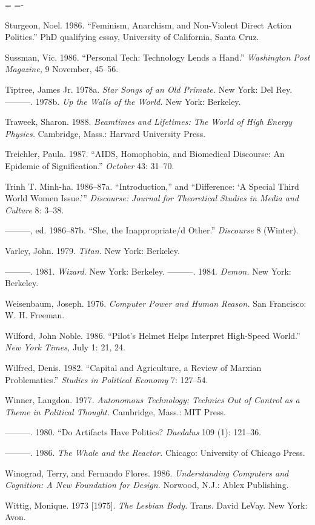 \documentclass[DIV=12,%
               BCOR=10mm,%
               headinclude=false,%
               footinclude=false,open=any,%
               fontsize=11pt,%
               twoside,%
               paper=210mm:11in]%
               {scrbook}
\newenvironment*{amusebiblio}{
  \leftskip=\parindent
  \parindent=-\parindent
  \smallskip
  \indent
}{\smallskip}
\newcommand*{\Slash}{\slash\hspace{0pt}}
\begin{document}
\begin{amusebiblio}
Sturgeon, Noel. 1986. “Feminism, Anarchism, and Non-Violent Direct Action Politics.” PhD qualifying essay, University of California, Santa Cruz.


Sussman, Vic. 1986. “Personal Tech: Technology Lends a Hand.” \emph{Washington Post Magazine,} 9 November, 45–56.


Tiptree, James Jr. 1978a. \emph{Star Songs of an Old Primate.} New York: Del Rey. ———. 1978b. \emph{Up the Walls of the World.} New York: Berkeley.


Traweek, Sharon. 1988. \emph{Beamtimes and Lifetimes: The World of High Energy Physics.} Cambridge, Mass.: Harvard University Press.


Treichler, Paula. 1987. “AIDS, Homophobia, and Biomedical Discourse: An Epidemic of Signification.” \emph{October} 43: 31–70.


Trinh T. Minh-ha. 1986–87a. “Introduction,” and “Difference: ‘A Special Third World Women Issue.’” \emph{Discourse: Journal for Theoretical Studies in Media and Culture} 8: 3–38.


———, ed. 1986–87b. “She, the Inappropriate\Slash{}d Other.” \emph{Discourse} 8 (Winter).


Varley, John. 1979. \emph{Titan.} New York: Berkeley.


———. 1981. \emph{Wizard.} New York: Berkeley. ———. 1984. \emph{Demon.} New York: Berkeley.


Weisenbaum, Joseph. 1976. \emph{Computer Power and Human Reason.} San Francisco: W. H. Freeman.


Wilford, John Noble. 1986. “Pilot’s Helmet Helps Interpret High-Speed World.” \emph{New York Times,} July 1: 21, 24.


Wilfred, Denis. 1982. “Capital and Agriculture, a Review of Marxian Problematics.” \emph{Studies in Political Economy} 7: 127–54.


Winner, Langdon. 1977. \emph{Autonomous Technology: Technics Out of Control as a Theme in Political Thought.} Cambridge, Mass.: MIT Press.


———. 1980. “Do Artifacts Have Politics? \emph{Daedalus} 109 (1): 121–36.


———. 1986. \emph{The Whale and the Reactor.} Chicago: University of Chicago Press.


Winograd, Terry, and Fernando Flores. 1986. \emph{Understanding Computers and Cognition: A New Foundation for Design.} Norwood, N.J.: Ablex Publishing.


Wittig, Monique. 1973 [1975]. \emph{The Lesbian Body.} Trans. David LeVay. New York: Avon.



\end{amusebiblio}
\end{document}
